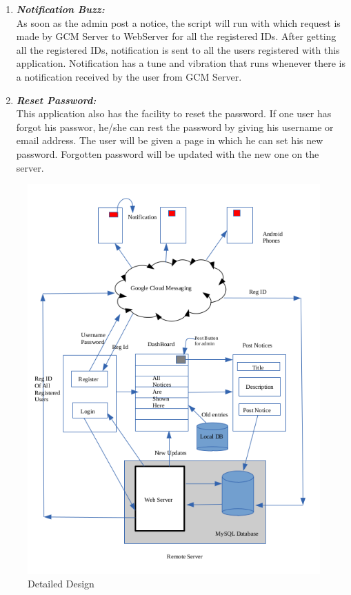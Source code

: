\begin{enumerate}
\item \textbf{\emph{Notification Buzz:}}\\
As soon as the admin post a notice, the script will run with which request is made by GCM Server to WebServer for all the registered IDs.
After getting all the registered IDs, notification is sent to all the users registered with this application.
Notification has a tune and vibration that runs whenever there is a notification received by the user from GCM Server.

\item \textbf{\emph{Reset Password:}}\\
This application also has the facility to reset the password. If one user has forgot his passwor, he/she can rest the password by giving
his username or email address. The user will be given a page in which he can set his new password. Forgotten password will be updated with the new one on the server.

\end{enumerate}

\begin{figure}[H]
\centering \includegraphics[scale=0.9]{image/detaildesign.png}
\caption{Detailed Design}
\end{figure}
\pagebreak

